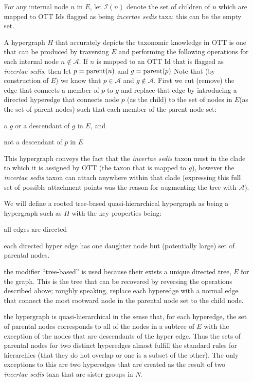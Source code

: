 \documentclass[11pt]{article}
\newcommand{\insed}{{\em incertae sedis}\xspace}
\newcommand{\specialHypergraph}{rooted tree-based quasi-hierarchical hypergraph \xspace}
\newcommand{\naiveFullTree}{\ensuremath{N}\xspace}
\newcommand{\augmentedFullTree}{\ensuremath{E}\xspace}
\newcommand{\specHyper}{\ensuremath{H}\xspace}
\newcommand{\insedChildren}[1]{\ensuremath{\mathcal{I}(#1)}\xspace}
\begin{document}
For any internal node $n$ in \augmentedFullTree, let \insedChildren{n}
     denote the set of children
    of $n$ which are mapped to OTT Ids flagged as being \insed taxa; this can be the empty set.

A hypergraph \specHyper that accurately depicts the taxonomic knowledge in OTT is one that can be produced by
    traversing $\augmentedFullTree$ and performing the following operations for each internal node $n\notin \mathcal{A}$.
If $n$ is mapped to an OTT Id that is flagged as \insed, then let $p=\mbox{parent}(n)$ and $g=\mbox{parent}(p)$
Note that (by construction of \augmentedFullTree) we know that 
    $p\in\mathcal{A}$ and $g\notin\mathcal{A}$.
First we cut (remove) the edge that connects a member of $p$ to $g$
    and replace that edge by introducing a directed hyperedge that connects node
    $p$ (as the child) to the set of nodes in \augmentedFullTree (as the set of parent nodes)
    such that each member of the parent node set:
\begin{compactitem}
    \item a $g$ or a descendant of $g$ in $\augmentedFullTree$, and
    \item not a descendant of $p$ in $\augmentedFullTree$
\end{compactitem}
This hypergraph conveys the fact that the \insed taxon must in the clade to which it is 
    assigned by OTT (the taxon that is mapped to $g$),
    however the \insed taxon can attach anywhere within that clade (expressing
    this full set of possible attachment points was the reason for augmenting the tree
    with $\mathcal{A}$).

We will define a \specialHypergraph as being a hypergraph such as $H$ with the key properties being:
\begin{compactitem}
    \item all edges are directed
    \item each directed hyper edge has one daughter node but (potentially large) set of parental nodes.
    \item the modifier ``tree-based'' is used because their exists a unique directed tree,
    $\augmentedFullTree$ for the graph. This is the tree that can be recovered by reversing the 
    operations described above; roughly speaking, replace each hyperedge with a normal edge that connect 
    the most rootward node in the parental node set to the child node.
    \item the hypergraph is quasi-hierarchical in the sense that, for each hyperedge, the set of parental
        nodes corresponds to all of the nodes in a subtree of $E$ with the exception of the nodes
        that are descendants of the hyper edge.
        Thus the sets of parental nodes for two distinct hyperedges almost fulfill the standard
        rules for hierarchies (that they do not overlap or one is a subset of the other).
        The only exceptions to this are two hyperedges that are created as the result of two 
        \insed taxa that are sister groups in \naiveFullTree.
\end{compactitem}


\end{document}
